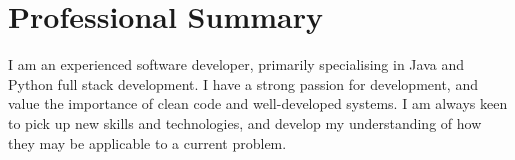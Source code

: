 \section{Professional Summary}

I am an experienced software developer, primarily specialising in Java and Python full stack development. 
I have a strong passion for development, and value the importance of clean code and well-developed systems. 
I am always keen to pick up new skills and technologies, and develop my understanding of how they may be applicable to a current problem.
